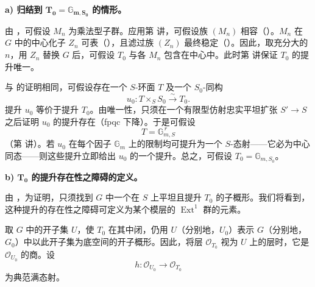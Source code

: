 

\medskip\noindent\textbf{a) 归结到 \(\boldsymbol{T_0=\mathbb G_{m,S_0}}\) 的情形。}

由 ，可假设 \(M_n\) 为乘法型子群。应用第  讲，可假设族 \((M_n)\) 相容（）。\(M_n\) 在 \(G\) 中的中心化子 \(Z_n\) 可表（），且滤过族 \((Z_n)\) 最终稳定（）。因此，取充分大的 \(n\)，用 \(Z_n\) 替换 \(G\) 后，可假设 \(T_0\) 与各 \(M_n\) 包含在中心中。此时第  讲保证 \(T_0\) 的提升唯一。

与  的证明相同，可假设存在一个 \(S\)-环面 \(T\) 及一个 \(S_0\)-同构
\[
  u_0:T\times_S S_0\xrightarrow{\sim}T_0.
\]
提升 \(u_0\) 等价于提升 \(T_0\)。由唯一性，只须在一个有限型仿射忠实平坦扩张 \(S'\to S\) 之后证明 \(u_0\) 的提升存在（fpqc 下降）。于是可假设
\[
  T=\mathbb G_{m,S}^{\,r}
\]
（第  讲）。若 \(u_0\) 在每个因子 \(\mathbb G_m\) 上的限制均可提升为一个 \(S\)-态射——它必为中心同态——则这些提升立即给出 \(u_0\) 的一个提升。总之，可假设 \(T_0=\mathbb G_{m,S_0}\)。

\medskip\noindent\textbf{b) \(\boldsymbol{T_0}\) 的提升存在性之障碍的定义。}

由 ，为证明，只须找到 \(G\) 中一个在 \(S\) 上平坦且提升 \(T_0\) 的子概形。我们将看到，这种提升的存在性之障碍可定义为某个模层的 \(\operatorname{Ext}^1\) 群的元素。

取 \(G\) 中的开子集 \(U\)，使 \(T_0\) 在其中闭，仍用 \(U\)（分别地，\(U_0\)）表示 \(G\)（分别地，\(G_0\)）中以此开子集为底空间的开子概形。因此，将层 \(\mathcal O_{T_0}\) 视为 \(U\) 上的层时，它是 \(\mathcal O_{U_0}\) 的商。设
\[
  h:\mathcal O_{U_0}\longrightarrow\mathcal O_{T_0}
\]
为典范满态射。


